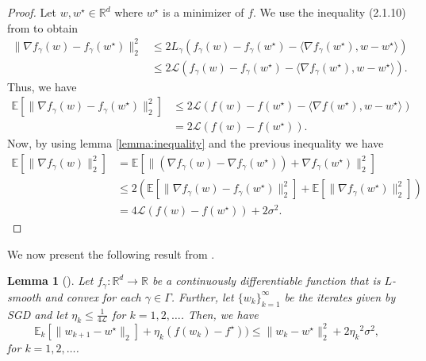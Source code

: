 \documentclass[12pt]{article}
\newtheorem{lemma}[lemma]{Lemma}
\theoremstyle{definition}
\numberwithin{equation}{section}
\newcommand{\R}{\mathbb{R}}
\newcommand{\E}{\mathbb{E}}
\newcommand{\CL}{\mathcal{L}}
\newcommand{\ev}[1]{\mathbb{E}\left[{#1}\right]}
\newcommand{\norm}[1]{\lVert{#1}\rVert_2}
\begin{document}
\begin{proof}
  Let $w, w^\star \in \R^d$ where $w^\star$ is a minimizer of $f$. We use the inequality (2.1.10) from \autocite{nesterovLecturesConvexOptimization2018} to obtain
  \begin{align*}
    \norm{\nabla f_{\gamma}(w) - f_{\gamma}(w^\star)}^2 &\leq 2L_{\gamma}(f_{\gamma}(w) - f_{\gamma}(w^\star) - \langle \nabla f_{\gamma}(w^\star), w - w^\star \rangle) \\
    &\leq 2\CL(f_{\gamma}(w) - f_{\gamma}(w^\star) - \langle \nabla f_{\gamma}(w^\star), w - w^\star \rangle).
  \end{align*}
  Thus, we have
  \begin{align*}
    \ev{\norm{\nabla f_{\gamma}(w) - f_{\gamma}(w^\star)}^2 } &\leq 2\CL(f(w) - f(w^\star) - \langle \nabla f(w^\star), w - w^\star \rangle) \\
    &= 2\CL(f(w) - f(w^\star)).
  \end{align*}
  Now, by using lemma \ref{lemma:inequality} and the previous inequality we have
  \begin{align*}
    \ev{\norm{\nabla f_{\gamma}(w)}^2} &= \ev{\norm{(\nabla f_{\gamma}(w) - \nabla f_{\gamma}(w^\star)) + \nabla f_{\gamma}(w^\star)}^2} \\
    &\leq 2( \ev{\norm{\nabla f_{\gamma}(w) - f_{\gamma}(w^\star)}^2 } + \ev{\norm{\nabla f_{\gamma}(w^\star)}^2}) \\
    &= 4\CL(f(w) - f(w^\star)) + 2\sigma^2.
  \end{align*}
\end{proof}
We now present the following result from \autocite{sebbouhAlmostSureConvergence2021}.
\begin{lemma}[]
  \label{lemma:sgd_iterates}
  Let $f_{\gamma} : \R^d \rightarrow \R$ be a continuously differentiable function that is $L$-smooth and convex for each $\gamma \in \Gamma$. Further, let $\{w_{k}\}_{k=1}^{\infty}$ be the iterates given by SGD and let $\eta_k \leq \frac{1}{4 \CL}$ for $k=1,2,\dots$. Then, we have
  \begin{equation*}
    \E_k[\norm{w_{k+1} - w^\star}] + \eta_k (f(w_{k}) - f^\star)) \leq \norm{w_{k} - w^\star}^2 + 2{\eta_k}^2\sigma^2,
  \end{equation*}
  for $k=1,2,\dots$.
\end{lemma}
\end{document}
